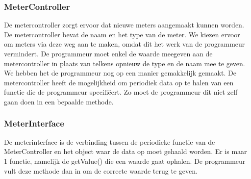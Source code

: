 \subsubsection{MeterController}
De metercontroller zorgt ervoor dat nieuwe meters aangemaakt kunnen worden. De metercontroller bevat de naam en het type van de meter. We kiezen ervoor om meters via deze weg aan te maken, omdat dit het werk van de programmeur vermindert. De programmeur moet enkel de waarde meegeven aan de metercontroller in plaats van telkens opnieuw de type en de naam mee te geven. We hebben het de programmeur nog op een manier gemakkelijk gemaakt. De metercontroller heeft de mogelijkheid om periodiek data op te halen van een functie die de programmeur specifiëert. Zo moet de programmeur dit niet zelf gaan doen in een bepaalde methode. 

\subsubsection{MeterInterface}
De meterinterface is de verbinding tussen de periodieke functie van de MeterController en het object waar de data op moet gehaald worden. Er is maar 1 functie, namelijk de getValue() die een waarde gaat ophalen. De programmeur vult deze methode dan in om de correcte waarde terug te geven.


